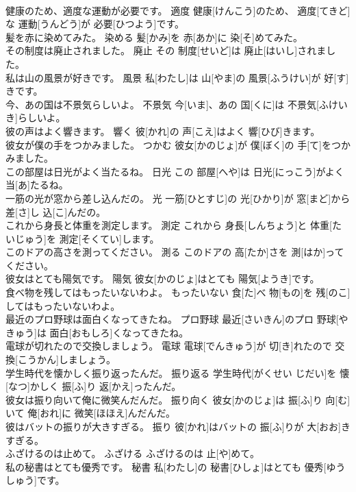 \documentclass[8pt]{extreport}
\begin{document}
\begin{CJK}{UTF8}{min}
\\	健康のため、適度な運動が必要です。	適度	健康[けんこう]のため、 適度[てきど]な 運動[うんどう]が 必要[ひつよう]です。	
\\	髪を赤に染めてみた。	染める	髪[かみ]を 赤[あか]に 染[そ]めてみた。	
\\	その制度は廃止されました。	廃止	その 制度[せいど]は 廃止[はいし]されました。	
\\	私は山の風景が好きです。	風景	私[わたし]は 山[やま]の 風景[ふうけい]が 好[す]きです。	
\\	今、あの国は不景気らしいよ。	不景気	今[いま]、あの 国[くに]は 不景気[ふけいき]らしいよ。	
\\	彼の声はよく響きます。	響く	彼[かれ]の 声[こえ]はよく 響[ひび]きます。	
\\	彼女が僕の手をつかみました。	つかむ	彼女[かのじょ]が 僕[ぼく]の 手[て]をつかみました。	
\\	この部屋は日光がよく当たるね。	日光	この 部屋[へや]は 日光[にっこう]がよく 当[あ]たるね。	
\\	一筋の光が窓から差し込んだの。	光	一筋[ひとすじ]の 光[ひかり]が 窓[まど]から 差[さ]し 込[こ]んだの。	
\\	これから身長と体重を測定します。	測定	これから 身長[しんちょう]と 体重[たいじゅう]を 測定[そくてい]します。	
\\	このドアの高さを測ってください。	測る	このドアの 高[たか]さを 測[はか]ってください。	
\\	彼女はとても陽気です。	陽気	彼女[かのじょ]はとても 陽気[ようき]です。	
\\	食べ物を残してはもったいないわよ。	もったいない	食[た]べ 物[もの]を 残[のこ]してはもったいないわよ。	
\\	最近のプロ野球は面白くなってきたね。	プロ野球	最近[さいきん]のプロ 野球[やきゅう]は 面白[おもしろ]くなってきたね。	
\\	電球が切れたので交換しましょう。	電球	電球[でんきゅう]が 切[き]れたので 交換[こうかん]しましょう。	
\\	学生時代を懐かしく振り返ったんだ。	振り返る	学生時代[がくせい じだい]を 懐[なつ]かしく 振[ふ]り 返[かえ]ったんだ。	
\\	彼女は振り向いて俺に微笑んだんだ。	振り向く	彼女[かのじょ]は 振[ふ]り 向[む]いて 俺[おれ]に 微笑[ほほえ]んだんだ。	
\\	彼はバットの振りが大きすぎる。	振り	彼[かれ]はバットの 振[ふ]りが 大[おお]きすぎる。	
\\	ふざけるのは止めて。	ふざける	ふざけるのは 止[や]めて。	
\\	私の秘書はとても優秀です。	秘書	私[わたし]の 秘書[ひしょ]はとても 優秀[ゆうしゅう]です。	

\end{CJK}
\end{document}
